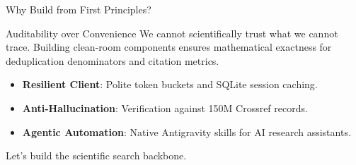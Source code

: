 \documentclass[aspectratio=169]{beamer}
\begin{document}
\begin{frame}{Why Build from First Principles?}
  \begin{block}{Auditability over Convenience}
    We cannot scientifically trust what we cannot trace. Building clean-room components ensures mathematical exactness for deduplication denominators and citation metrics.
  \end{block}
  \vspace{0.3cm}
  \begin{itemize}
    \item \textbf{Resilient Client}: Polite token buckets and SQLite session caching.
    \item \textbf{Anti-Hallucination}: Verification against 150M Crossref records.
    \item \textbf{Agentic Automation}: Native Antigravity skills for AI research assistants.
  \end{itemize}
\end{frame}

\begin{frame}[standout]
  Let's build the scientific search backbone.
\end{frame}
\end{document}

